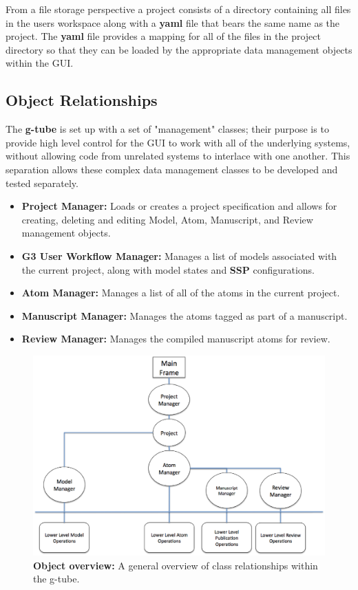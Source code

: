 \documentclass[12pt]{article}
\begin{document}
From a file storage perspective a project consists of a directory containing all files in the users workspace along with a {\bf yaml} file that bears the same name as the project. The {\bf yaml} file provides a mapping for all of the files in the project directory so that they can be loaded by the appropriate data management objects within the GUI.

\subsection*{Object Relationships}

	The {\bf g-tube} is set up with a set of "management" classes; their purpose is to provide high level control for the GUI to work with all of the underlying systems, without allowing code from unrelated systems to interlace with one another. This separation allows these complex data management classes to be developed and tested separately.

\begin{itemize}
	\item[] {\bf Project Manager:} Loads or creates a project specification and allows for creating, deleting and editing Model, Atom, Manuscript, and Review management objects.
	\item[] {\bf G3 User Workflow Manager:} Manages a list of models associated with the current project, along with model states and {\bf SSP} configurations.
	\item[] {\bf Atom Manager:} Manages a list of all of the atoms in the current project. 
	\item[] {\bf Manuscript Manager:} Manages the atoms tagged as part of a manuscript.
	\item[] {\bf Review Manager:} Manages the compiled manuscript atoms for review.
\end{itemize}

\begin{figure}[ht]
   \centering
   \includegraphics[scale=0.35]{figures/Overview.eps}
   \caption{{\bf Object overview:} A general overview of class relationships within the g-tube.}
   \label{figure: 1}
\end{figure}
\end{document}
